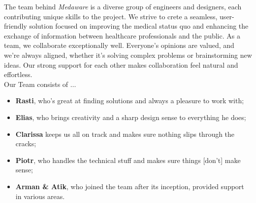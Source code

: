 The team behind \textit{Medaware} is a diverse group of engineers and designers, each contributing unique skills to the project.
We strive to crete a seamless, user-friendly solution focused on improving the medical status quo and enhancing the exchange of
information between healthcare professionals and the public. As a team, we collaborate exceptionally well. Everyone's
opinions are valued, and we're always aligned, whether it's solving complex problems or brainstorming new ideas.
Our strong support for each other makes collaboration feel natural and effortless.\\[2\baselineskip]
Our Team consists of $\dots$ \\
\begin{itemize}
	\renewcommand{\labelitemi}{}
	\item \textbf{Rasti}, who's great at finding solutions and always a pleasure to work with;
	\item \textbf{Elias}, who brings creativity and a sharp design sense to everything he does;
	\item \textbf{Clarissa} keeps us all on track and makes sure nothing slips through the cracks;
	\item \textbf{Piotr}, who handles the technical stuff and makes sure things [don't] make sense;
	\item \textbf{Arman \& Atik}, who joined the team after its inception, provided support in various areas.
\end{itemize}
